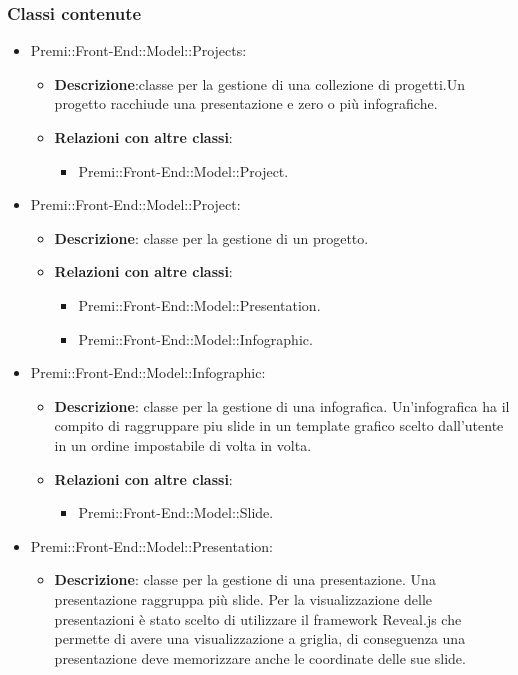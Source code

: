 	\subsubsection{Classi contenute}
		\begin{itemize}
		 \item Premi::Front-End::Model::Projects:
			\begin{itemize}
				\item \textbf{Descrizione}:classe per la gestione di una collezione di progetti.Un progetto racchiude una presentazione e zero o più infografiche.
				\item \textbf{Relazioni con altre classi}:
				\begin{itemize}
					\item Premi::Front-End::Model::Project.
				\end{itemize}
			\end{itemize}
		\item  Premi::Front-End::Model::Project: 
			 \begin{itemize}
				\item \textbf{Descrizione}: classe per la gestione di un progetto.
				\item \textbf{Relazioni con altre classi}:
				\begin{itemize}
					\item Premi::Front-End::Model::Presentation.
					\item Premi::Front-End::Model::Infographic.
				\end{itemize}
			\end{itemize}
		 \item  Premi::Front-End::Model::Infographic:
			\begin{itemize}
				\item \textbf{Descrizione}: classe per la gestione di una infografica. Un'infografica ha il compito di raggruppare piu slide in un template grafico scelto dall'utente in un ordine impostabile di volta in volta.
				\item \textbf{Relazioni con altre classi}:
				\begin{itemize}
					\item Premi::Front-End::Model::Slide.
				\end{itemize}
			\end{itemize}
		 \item   Premi::Front-End::Model::Presentation:
			\begin{itemize}
				\item \textbf{Descrizione}: classe per la gestione di una presentazione. Una presentazione raggruppa più slide. Per la visualizzazione delle presentazioni è stato scelto di utilizzare il framework Reveal.js che permette di avere una visualizzazione a griglia, di conseguenza una presentazione deve memorizzare anche le coordinate delle sue slide.

\end{itemize}
\end{itemize}
